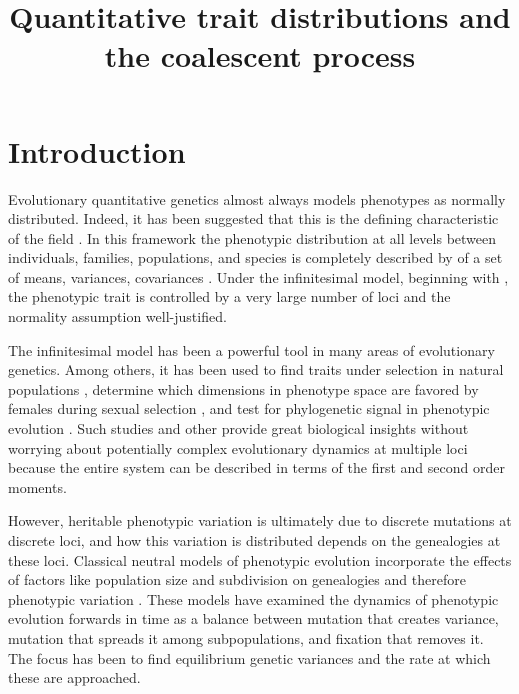 \documentclass{article}
\begin{document}
\title{Quantitative trait distributions and the coalescent process}
\maketitle

\section{Introduction}

Evolutionary quantitative genetics almost always models phenotypes as normally
distributed. Indeed, it has been suggested that this is the defining
characteristic of the field \citep{Rice2004}. In this framework the phenotypic
distribution at all levels between individuals, families, populations, and
species is completely described by of a set of means, variances, covariances
\citep{Falconer1996}. Under the infinitesimal model, beginning with
\citet{Fisher1919}, the phenotypic trait is controlled by a very large number of
loci and the normality assumption well-justified.

The infinitesimal model has been a powerful tool in many areas of evolutionary
genetics. Among others, it has been used to find traits under selection in
natural populations \citep{Price1984}, determine which dimensions in phenotype
space are favored by females during sexual selection \citep{Blows2004}, and test
for phylogenetic signal in phenotypic evolution \citep{Freckleton2002}. Such
studies and other provide great biological insights without worrying about
potentially complex evolutionary dynamics at multiple loci because the entire
system can be described in terms of the first and second order moments.

However, heritable phenotypic variation is ultimately due to discrete mutations
at discrete loci, and how this variation is distributed depends on the
genealogies at these loci. Classical neutral models of phenotypic evolution
incorporate the effects of factors like population size and subdivision on
genealogies and therefore phenotypic variation .
These models have examined the dynamics of phenotypic evolution forwards in time
as a balance between mutation that creates variance, mutation that spreads it
among subpopulations, and fixation that removes it. The focus has been to find
equilibrium genetic variances and the rate at which these are approached.
\end{document}
